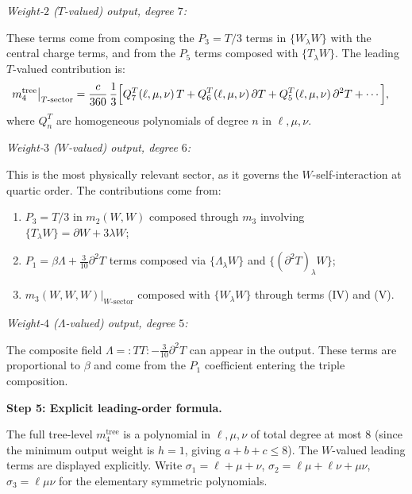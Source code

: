 \smallskip
\emph{Weight-$2$ ($T$-valued) output, degree $7$:}

These terms come from composing the $P_3 = T/3$ terms in
$\{W_\lambda W\}$ with the central charge terms, and from the
$P_5$ terms composed with $\{T_\lambda W\}$. The leading
$T$-valued contribution is:
\begin{align}
\label{eq:m4-T-sector}
m_4^{\mathrm{tree}}\big|_{T\text{-sector}}
&= \frac{c}{360}\,\frac{1}{3}\Bigl[
 Q_7^T(\ell,\mu,\nu)\,T
 + Q_6^T(\ell,\mu,\nu)\,\partial T
 + Q_5^T(\ell,\mu,\nu)\,\partial^2 T
 + \cdots\Bigr],
\end{align}
where $Q_n^T$ are homogeneous polynomials of degree $n$ in
$\ell,\mu,\nu$.

\smallskip
\emph{Weight-$3$ ($W$-valued) output, degree $6$:}

This is the most physically relevant sector, as it governs the
$W$-self-interaction at quartic order. The contributions come from:
\begin{enumerate}
\item[(a)] $P_3 = T/3$ in $m_2(W,W)$ composed through $m_3$
involving $\{T_\lambda W\} = \partial W + 3\lambda W$;
\item[(b)] $P_1 = \beta\Lambda + \tfrac{3}{10}\partial^2 T$
terms composed via $\{\Lambda_\lambda W\}$ and
$\{(\partial^2 T)_\lambda W\}$;
\item[(c)] $m_3(W,W,W)|_{W\text{-sector}}$ composed with
$\{W_\lambda W\}$ through terms (IV) and (V).
\end{enumerate}

\smallskip
\emph{Weight-$4$ ($\Lambda$-valued) output, degree $5$:}

The composite field $\Lambda = {:}TT{:} - \tfrac{3}{10}\partial^2 T$
can appear in the output. These terms are proportional to $\beta$
and come from the $P_1$ coefficient entering the triple composition.

\medskip
\noindent\textbf{Step 5: Explicit leading-order formula.}

The full tree-level $m_4^{\mathrm{tree}}$ is a polynomial in
$\ell, \mu, \nu$ of total degree at most $8$ (since the
minimum output weight is $h=1$, giving $a+b+c \le 8$).
The $W$-valued leading terms are displayed explicitly.
Write $\sigma_1 = \ell + \mu + \nu$,
$\sigma_2 = \ell\mu + \ell\nu + \mu\nu$,
$\sigma_3 = \ell\mu\nu$ for the elementary symmetric polynomials.

